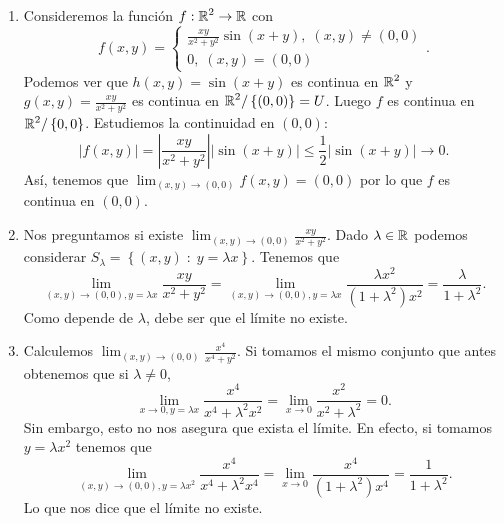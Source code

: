 \begin{eg}
\begin{enumerate}
\item Consideremos la función $\displaystyle f : \mathbb{R}^{2} \to \mathbb{R} $ con 
	\[f\left(x,y\right) = 
	\begin{cases}
	\frac{xy}{x^{2}+y^{2}}\sin\left(x+y\right), \; \left(x,y\right) \neq \left(0,0\right) \\
	0, \; \left(x,y\right) = \left(0,0\right)
	\end{cases}
	.\]
	Podemos ver que $\displaystyle h\left(x,y\right) = \sin\left(x+y\right) $ es continua en $\displaystyle \mathbb{R}^{2} $ y $\displaystyle g\left(x,y\right) = \frac{xy}{x^{2}+y^{2}} $ es continua en $\displaystyle \mathbb{R}^{2}/ \left\{ \left(0,0\right)\right\} = U $. Luego $\displaystyle f $ es continua en $\displaystyle \mathbb{R}^{2}/ \left\{ 0,0\right\}  $. Estudiemos la continuidad en $\displaystyle \left(0,0\right) $:
\[ \left|f\left(x,y\right)\right| = \left|\frac{xy}{x^{2}+y^{2}}\right| \left|\sin\left(x+y\right)\right| \leq \frac{1}{2} \left|\sin\left(x+y\right)\right| \to 0 .\]
Así, tenemos que $\displaystyle \lim_{\left(x,y\right) \to \left(0,0\right)}f\left(x,y\right) = \left(0,0\right) $ por lo que $\displaystyle f $ es continua en $\displaystyle \left(0,0\right) $. 
\item Nos preguntamos si existe $\displaystyle \lim_{\left(x,y\right) \to \left(0,0\right)}\frac{xy}{x^{2}+y^{2}} $. Dado $\displaystyle \lambda \in \mathbb{R} $ podemos considerar $\displaystyle S_{\lambda } = \left\{ \left(x,y\right) \; : \; y = \lambda x\right\}  $. Tenemos que
	\[\lim_{\left(x,y\right) \to \left(0,0\right), y = \lambda x}\frac{xy}{x^{2}+y^{2}} = \lim_{\left(x,y\right) \to \left(0,0\right), y = \lambda x} \frac{\lambda x^{2}}{\left(1+\lambda ^{2}\right)x^{2}} = \frac{\lambda }{1 + \lambda^{2}}.\]
Como depende de $\displaystyle \lambda  $, debe ser que el límite no existe. 
\item Calculemos $\displaystyle \lim_{\left(x,y\right) \to \left(0,0\right)}\frac{x^{4}}{x^{4}+y^{2}} $. Si tomamos el mismo conjunto que antes obtenemos que si $\displaystyle \lambda \neq 0 $,
	\[\lim_{x \to 0, y = \lambda x}\frac{x^{4}}{x^{4}+\lambda ^{2}x^{2}} = \lim_{x \to 0}\frac{x^{2}}{x^{2}+\lambda ^{2}} = 0 .\]
Sin embargo, esto no nos asegura que exista el límite. En efecto, si tomamos $\displaystyle y = \lambda x^{2} $ tenemos que
\[\lim_{\left(x,y\right) \to \left(0,0\right), y = \lambda x^{2}}\frac{x^{4}}{x^{4}+\lambda ^{2}x^{4}} = \lim_{x \to 0}\frac{x^{4}}{\left(1+\lambda ^{2}\right)x^{4}} = \frac{1}{1 + \lambda^{2}} .\]
Lo que nos dice que el límite no existe. 
\end{enumerate}
\end{eg}
